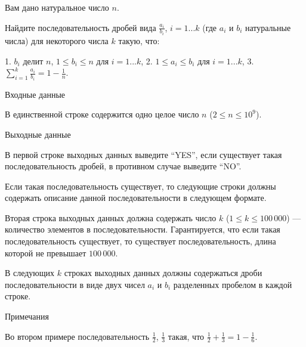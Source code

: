 Вам дано натуральное число $n$.

Найдите последовательность дробей вида $\frac{a_i}{b_i}$, $i = 1...k$
(где $a_i$ и $b_i$ натуральные числа) для некоторого числа $k$ такую, что:

1. $b_i$ делит $n$, $1 \le b_i \le n$ для $i = 1...k$,
2. $1 \le a_i \le b_i$ для $i = 1...k$,
3. $\sum_{i = 1}^{k} \frac{a_i}{b_i} = 1 - \frac{1}{n}$.

Входные данные

В единственной строке содержится одно целое число $n$ ($2 \le n \le 10^9$).

Выходные данные

В первой строке выходных данных выведите ``YES'', если существует такая последовательность дробей, в противном случае выведите ``NO''.

Если такая последовательность существует, то следующие строки должны содержать описание данной последовательности в следующем формате.

Вторая строка выходных данных должна содержать число $k$ ($1 \le k \le 100\,000$) --- количество элементов в последовательности.
Гарантируется, что если такая последовательность существует, то существует последовательность, длина которой не превышает $100\,000$.

В следующих $k$ строках выходных данных должны содержаться дроби последовательности в виде двух чисел $a_i$ и $b_i$ разделенных пробелом в каждой строке.

Примечания

Во втором примере последовательность $\frac{1}{2}$, $\frac{1}{3}$ такая, что $\frac{1}{2} + \frac{1}{3} = 1 - \frac{1}{6}$.
